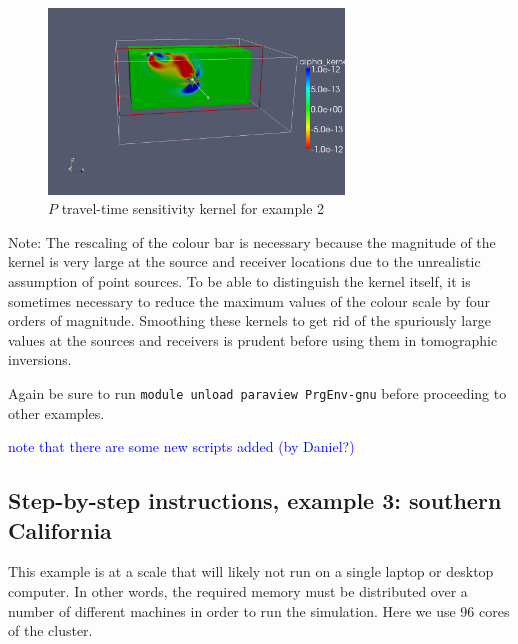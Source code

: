 \documentclass[10pt,fleqn,letterpaper]{article}
\newcommand{\blue}[1]{\textcolor{blue}{#1}}
\begin{document}
\begin{enumerate}
\begin{figure}[h]
\begin{center}
\includegraphics[width=0.7\textwidth]{homogeneous_halfspace_P_kernel.png}
\end{center}
\caption{$P$ travel-time sensitivity kernel for example 2}
\end{figure}

Note: The rescaling of the colour bar is necessary because the magnitude of the kernel is very large at the source and receiver locations due to the unrealistic assumption of point sources. To be able to distinguish the kernel itself, it is sometimes necessary to reduce the maximum values of the colour scale by four orders of magnitude. Smoothing these kernels to get rid of the spuriously large values at the sources and receivers is prudent before using them in tomographic inversions.
   
Again be sure to run \lstinline{module unload paraview PrgEnv-gnu} before proceeding to other examples.

\end{enumerate}

\blue{note that there are some new scripts added (by Daniel?)}



\subsection*{Step-by-step instructions, example 3: southern California}

This example is at a scale that will likely not run on a single laptop or desktop computer. In other words, the required memory must be distributed over a number of different machines in order to run the simulation. Here we use 96 cores of the cluster.
\end{document}

